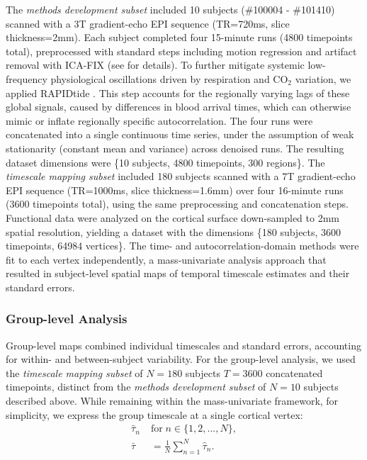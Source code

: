 \documentclass[9pt]{article}
\begin{document}
The \textit{methods development subset} included 10 subjects  (\#100004 - \#101410) scanned with a 3T gradient-echo EPI sequence (TR=720ms, slice thickness=2mm). Each subject completed four 15-minute runs (4800 timepoints total), preprocessed with standard steps including motion regression and artifact removal with ICA-FIX (see \citet{glasser_minimal_2013, salimi-khorshidi_automatic_2014} for details). To further mitigate systemic low-frequency physiological oscillations driven by respiration and $\text{CO}_2$ variation, we applied RAPIDtide \citep{frederick_rapidtide_2025}. This step accounts for the regionally varying lags of these global signals, caused by differences in blood arrival times, which can otherwise mimic or inflate regionally specific autocorrelation. The four runs were concatenated into a single continuous time series, under the assumption of weak stationarity (constant mean and variance) across denoised runs. The resulting dataset dimensions were \{10 subjects, 4800 timepoints, 300 regions\}. The \textit{timescale mapping subset} included 180 subjects scanned with a 7T gradient-echo EPI sequence (TR=1000ms, slice thickness=1.6mm) over four 16-minute runs (3600 timepoints total), using the same preprocessing and concatenation steps. Functional data were analyzed on the cortical surface down-sampled to 2mm spatial resolution, yielding a dataset with the dimensions \{180 subjects, 3600 timepoints, 64984 vertices\}. The time- and autocorrelation-domain methods were fit to each vertex independently, a mass-univariate analysis approach that resulted in subject-level spatial maps of temporal timescale estimates and their standard errors.\\

\subsubsection{Group-level Analysis}\label{sec:group-level-analysis}
Group-level maps combined individual timescales and standard errors, accounting for within- and between-subject variability. For the group-level analysis, we used the \textit{timescale mapping subset} of $N=180$ subjects $T=3600$ concatenated timepoints, distinct from the \textit{methods development subset} of $N=10$ subjects described above. While remaining within the mass-univariate framework, for simplicity, we express the group timescale at a single cortical vertex:
\begin{align}
    \hat\tau_n \; &\text{for} \; n\in\{1, 2, ..., N\},\\
    \bar\tau &= \frac{1}{N} \sum_{n=1}^N \hat\tau_n.
\end{align}
\end{document}
